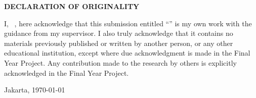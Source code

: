 \begin{center}
	\fontsize{14bp}{1.5\baselineskip}\selectfont
	\textbf{DECLARATION OF ORIGINALITY}
\end{center}
\begin{justify}
	\begin{doublespace}
		I, \AUTHOR \ \STUDENTID, here acknowledge that this submission entitled “\TITLE” is my own work with the guidance from my supervisor. I also truly acknowledge that it contains no materials previously published or written by another person, or any other educational institution, except where due acknowledgment is made in the Final Year Project. Any contribution made to the research by others is explicitly acknowledged in the Final Year Project.	
	\end{doublespace}
	\fontsize{12bp}{1.5\baselineskip}\selectfont

	\noindent Jakarta, \today
	
	
	\noindent \AUTHOR
\end{justify}
\pagebreak